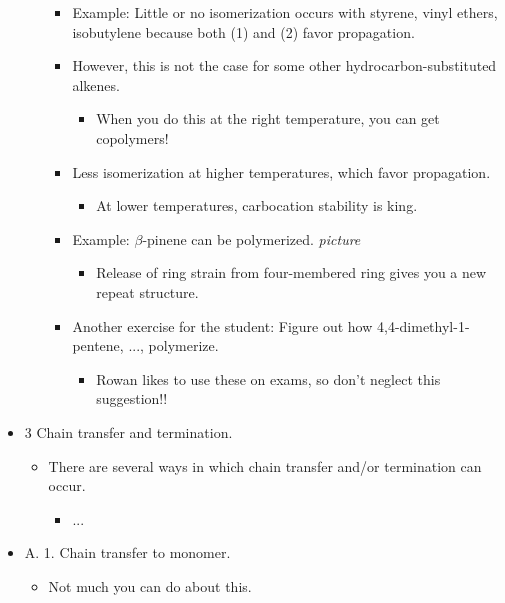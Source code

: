 \documentclass[../notes.tex]{subfiles}
\begin{document}
\begin{itemize}
\begin{enumerate}[label={\Alph*)}]
\begin{itemize}
            \item Example: Little or no isomerization occurs with styrene, vinyl ethers, isobutylene because both (1) and (2) favor propagation.
            \item However, this is not the case for some other hydrocarbon-substituted alkenes.
            \begin{itemize}
                \item When you do this at the right temperature, you can get copolymers!
            \end{itemize}
            \item Less isomerization at higher temperatures, which favor propagation.
            \begin{itemize}
                \item At lower temperatures, carbocation stability is king.
            \end{itemize}
            \item Example: $\beta$-pinene can be polymerized.
            \emph{picture}
            \begin{itemize}
                \item Release of ring strain from four-membered ring gives you a new repeat structure.
            \end{itemize}
            \item Another exercise for the student: Figure out how 4,4-dimethyl-1-pentene, ..., polymerize.
            \begin{itemize}
                \item Rowan likes to use these on exams, so don't neglect this suggestion!!
            \end{itemize}
        \end{itemize}
    \end{enumerate}
    \item 3 Chain transfer and termination.
    \begin{itemize}
        \item There are several ways in which chain transfer and/or termination can occur.
        \begin{itemize}
            \item ...
        \end{itemize}
    \end{itemize}
    \item A. 1. Chain transfer to monomer.
    \begin{itemize}
        \item Not much you can do about this.

\end{itemize}
\end{itemize}
\end{document}
